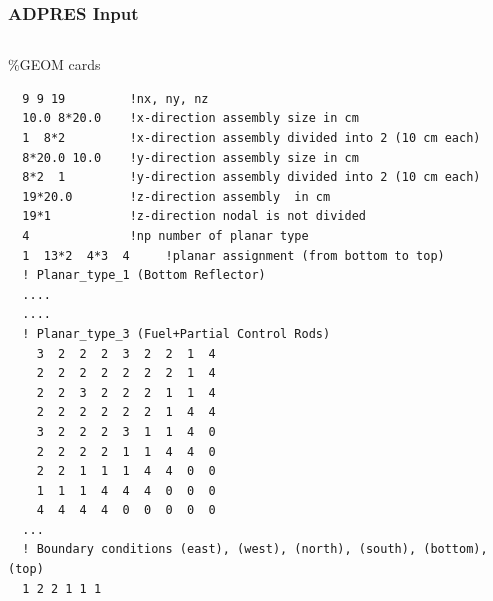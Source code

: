 \documentclass{beamer}
\begin{document}
\begin{frame}[fragile] %
\frametitle{ADPRES Input}
\begin{columns}[c] %

\begin{block}{\%GEOM cards}
\begin{Verbatim}[fontsize=\tiny]
  %GEOM
  9 9 19         !nx, ny, nz
  10.0 8*20.0    !x-direction assembly size in cm
  1  8*2         !x-direction assembly divided into 2 (10 cm each)
  8*20.0 10.0    !y-direction assembly size in cm
  8*2  1         !y-direction assembly divided into 2 (10 cm each)
  19*20.0        !z-direction assembly  in cm
  19*1           !z-direction nodal is not divided
  4              !np number of planar type
  1  13*2  4*3  4     !planar assignment (from bottom to top)
  ! Planar_type_1 (Bottom Reflector)
  ....
  ....
  ! Planar_type_3 (Fuel+Partial Control Rods)
    3  2  2  2  3  2  2  1  4
    2  2  2  2  2  2  2  1  4
    2  2  3  2  2  2  1  1  4
    2  2  2  2  2  2  1  4  4
    3  2  2  2  3  1  1  4  0
    2  2  2  2  1  1  4  4  0
    2  2  1  1  1  4  4  0  0
    1  1  1  4  4  4  0  0  0
    4  4  4  4  0  0  0  0  0
  ...
  ! Boundary conditions (east), (west), (north), (south), (bottom), (top)
  1 2 2 1 1 1
\end{Verbatim}
\end{block}


\end{columns}
\end{frame}
\end{document}
